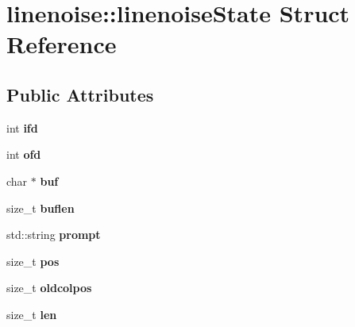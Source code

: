 \hypertarget{structlinenoise_1_1linenoise_state}{}\section{linenoise\+:\+:linenoise\+State Struct Reference}
\label{structlinenoise_1_1linenoise_state}
\subsection*{Public Attributes}
\begin{DoxyCompactItemize}
\item 
\mbox{\label{structlinenoise_1_1linenoise_state_a2120b34b7304b27028eed9703f20a374}} 
int {\bfseries ifd}
\item 
\mbox{\label{structlinenoise_1_1linenoise_state_aa381cd71e5f345926227cd1f8e800bf0}} 
int {\bfseries ofd}
\item 
\mbox{\label{structlinenoise_1_1linenoise_state_aa55d2e949a2aad7dc7b5edcb7a4990e9}} 
char $\ast$ {\bfseries buf}
\item 
\mbox{\label{structlinenoise_1_1linenoise_state_af46c04ee055c0722cb02f4bdc449103b}} 
size\+\_\+t {\bfseries buflen}
\item 
\mbox{\label{structlinenoise_1_1linenoise_state_aac0456b65d58bdef03a840b273d783f1}} 
std\+::string {\bfseries prompt}
\item 
\mbox{\label{structlinenoise_1_1linenoise_state_a4b421ad45452c1542d6ab8cb9606dbde}} 
size\+\_\+t {\bfseries pos}
\item 
\mbox{\label{structlinenoise_1_1linenoise_state_ae1f16ec76ddf6f6ad059914104f57414}} 
size\+\_\+t {\bfseries oldcolpos}
\item 
\mbox{\label{structlinenoise_1_1linenoise_state_a0c677ff2161bc5f0c8dac1565ade2e72}} 
size\+\_\+t {\bfseries len}
\item 

\end{DoxyCompactItemize}
